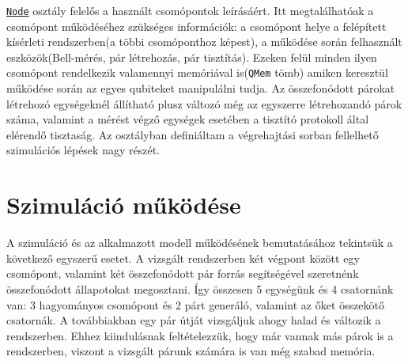 \underline{\texttt{Node}} osztály felelős a használt csomópontok leírásáért. Itt megtalálhatóak a csomópont működéséhez szükséges információk:  a csomópont helye a felépített kísérleti rendszerben(a többi csomóponthoz képest), a működése során felhasznált eszközök(Bell-mérés, pár létrehozás, pár tisztítás). Ezeken felül minden ilyen csomópont rendelkezik valamennyi memóriával is(\texttt{QMem} tömb) amiken keresztül működése során az egyes qubiteket manipulálni tudja. Az összefonódott párokat létrehozó egységeknél állítható plusz változó még az egyszerre létrehozandó párok száma, valamint a mérést végző egységek esetében a tisztító protokoll által elérendő tisztaság. Az osztályban definiáltam a végrehajtási sorban fellelhető szimulációs lépések nagy részét.

\section{Szimuláció működése}

A szimuláció és az alkalmazott modell működésének bemutatásához tekintsük a következő egyszerű esetet. A vizsgált rendszerben két végpont között egy csomópont, valamint két összefonódott pár forrás segítségével szeretnénk összefonódott állapotokat megosztani. Így összesen 5 egységünk és 4 csatornánk van: 3 hagyományos csomópont és 2 párt generáló, valamint az őket összekötő csatornák. A továbbiakban egy pár útját vizsgáljuk ahogy halad és változik a rendszerben. Ehhez kiindulásnak feltételezzük, hogy már vannak más párok is a rendszerben, viszont a vizsgált párunk számára is van még szabad memória.

